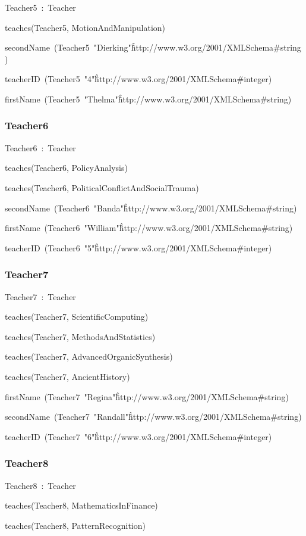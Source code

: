 \documentclass{article}
\begin{document}
Teacher5~:~Teacher

teaches(Teacher5, MotionAndManipulation)

secondName~(Teacher5~"Dierking"\^\^http://www.w3.org/2001/XMLSchema#string)

teacherID~(Teacher5~"4"\^\^http://www.w3.org/2001/XMLSchema#integer)

firstName~(Teacher5~"Thelma"\^\^http://www.w3.org/2001/XMLSchema#string)

\subsubsection*{Teacher6}

Teacher6~:~Teacher

teaches(Teacher6, PolicyAnalysis)

teaches(Teacher6, PoliticalConflictAndSocialTrauma)

secondName~(Teacher6~"Banda"\^\^http://www.w3.org/2001/XMLSchema#string)

firstName~(Teacher6~"William"\^\^http://www.w3.org/2001/XMLSchema#string)

teacherID~(Teacher6~"5"\^\^http://www.w3.org/2001/XMLSchema#integer)

\subsubsection*{Teacher7}

Teacher7~:~Teacher

teaches(Teacher7, ScientificComputing)

teaches(Teacher7, MethodsAndStatistics)

teaches(Teacher7, AdvancedOrganicSynthesis)

teaches(Teacher7, AncientHistory)

firstName~(Teacher7~"Regina"\^\^http://www.w3.org/2001/XMLSchema#string)

secondName~(Teacher7~"Randall"\^\^http://www.w3.org/2001/XMLSchema#string)

teacherID~(Teacher7~"6"\^\^http://www.w3.org/2001/XMLSchema#integer)

\subsubsection*{Teacher8}

Teacher8~:~Teacher

teaches(Teacher8, MathematicsInFinance)

teaches(Teacher8, PatternRecognition)
\end{document}
